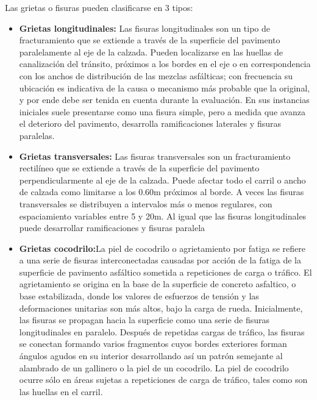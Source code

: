\documentclass[11pt,a4paper]{article}
\begin{document}
Las grietas o fisuras pueden clasificarse en 3 tipos:

\begin{itemize}
	\item \textbf{Grietas longitudinales:} Las fisuras longitudinales son un tipo de fracturamiento que se extiende a través de la superficie del pavimento	paralelamente al eje de la calzada. 
	Pueden localizarse en las huellas de canalización del tránsito, próximos a los bordes en el eje o en correspondencia con los anchos de distribución de las mezclas asfálticas; con frecuencia su ubicación es indicativa de la causa o	mecanismo más probable que la original, y por ende debe ser tenida en cuenta durante la evaluación. 
	En sus instancias iniciales suele presentarse como una fisura simple, pero a medida que avanza el deterioro del pavimento, desarrolla ramificaciones laterales y fisuras paralelas.
	\item \textbf{Grietas transversales:} Las fisuras transversales son un fracturamiento rectilíneo que se extiende a través de la superficie del pavimento perpendicularmente al eje de la calzada. Puede afectar todo el  carril  o  ancho  de  calzada  como  limitarse  a  los  0.60m  próximos  al borde. A veces las fisuras transversales se distribuyen a intervalos más o  menos  regulares,  con  espaciamiento  variables  entre  5  y  20m.  Al igual que las fisuras longitudinales puede desarrollar ramificaciones y fisuras paralela
	\item \textbf{Grietas cocodrilo:}La  piel  de  cocodrilo  o  agrietamiento  por  fatiga  se refiere  a  una  serie  de  fisuras interconectadas causadas por acción de la fatiga de la superficie de pavimento asfáltico sometida a repeticiones de carga o tráfico. El agrietamiento se origina en la base de la superficie de concreto asfaltico, o base estabilizada, donde los valores de esfuerzos de tensión y las deformaciones unitarias son más altos, bajo la carga de rueda. Inicialmente, las  fisuras  se  propagan  hacia  la  superficie  como  una  serie  de  fisuras  longitudinales  en paralelo. Después de repetidas cargas de tráfico, las fisuras se conectan formando varios fragmentos cuyos bordes exteriores forman ángulos agudos en su interior desarrollando así un patrón semejante al alambrado de un gallinero o la piel de un cocodrilo. La piel de cocodrilo ocurre sólo en áreas sujetas a repeticiones de carga de tráfico, tales como son las huellas en el carril. 
\end{itemize}
\end{document}
